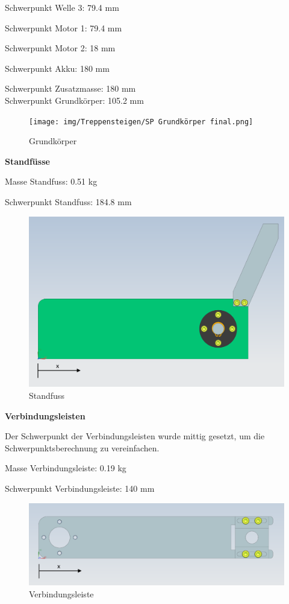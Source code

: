 Schwerpunkt Welle 3: 79.4 mm

Schwerpunkt Motor 1: 79.4 mm

Schwerpunkt Motor 2: 18 mm

Schwerpunkt Akku: 180 mm

Schwerpunkt Zusatzmasse: 180 mm\\

Schwerpunkt Grundkörper: 105.2 mm

\begin{figure}[H]
  \texttt{[image: img/Treppensteigen/SP Grundkörper final.png]}
  \centering
  \caption{Grundkörper}
\end{figure}

\newpage

\textbf{Standfüsse}

Masse Standfuss: 0.51 kg

Schwerpunkt Standfuss: 184.8 mm

\begin{figure}[H]
  \includegraphics[width=0.8
  \textwidth]{img/Treppensteigen/SP Standfuss final.png}
  \centering
  \caption{Standfuss}
\end{figure}

\textbf{Verbindungsleisten}

Der Schwerpunkt der Verbindungsleisten wurde mittig gesetzt, um die Schwerpunktsberechnung zu vereinfachen.

Masse Verbindungsleiste: 0.19 kg

Schwerpunkt Verbindungsleiste: 140 mm

\begin{figure}[H]
  \includegraphics[width=0.8
  \textwidth]{img/Treppensteigen/SP Verbindungsleiste final.png}
  \centering
  \caption{Verbindungsleiste}
\end{figure}

